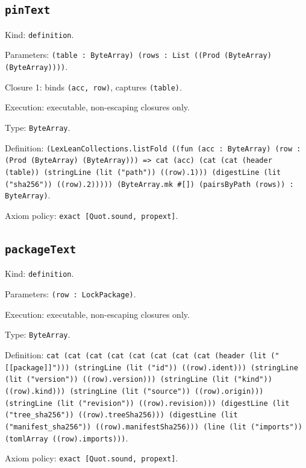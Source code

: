 \documentclass[11pt]{article}
\begin{document}
\subsection*{\texttt{pinText}}
\noindent Kind: \texttt{definition}.\par
\noindent Parameters: \texttt{(table : ByteArray) (rows : List ((Prod (ByteArray) (ByteArray))))}.\par
\noindent Closure 1: binds \texttt{(acc, row)}, captures \texttt{(table)}.\par
\noindent Execution: executable, non-escaping closures only.\par
\noindent Type: \texttt{ByteArray}.\par
\noindent Definition: \texttt{(LexLeanCollections.listFold ((fun (acc : ByteArray) (row : (Prod (ByteArray) (ByteArray))) => cat (acc) (cat (cat (header (table)) (stringLine (lit ("path")) ((row).1))) (digestLine (lit ("sha256")) ((row).2))))) (ByteArray.mk \#[]) (pairsByPath (rows)) : ByteArray)}.\par
\noindent Axiom policy: \texttt{exact [Quot.sound, propext]}.\par
\subsection*{\texttt{packageText}}
\noindent Kind: \texttt{definition}.\par
\noindent Parameters: \texttt{(row : LockPackage)}.\par
\noindent Execution: executable, non-escaping closures only.\par
\noindent Type: \texttt{ByteArray}.\par
\noindent Definition: \texttt{cat (cat (cat (cat (cat (cat (cat (cat (header (lit ("[[package]]"))) (stringLine (lit ("id")) ((row).ident))) (stringLine (lit ("version")) ((row).version))) (stringLine (lit ("kind")) ((row).kind))) (stringLine (lit ("source")) ((row).origin))) (stringLine (lit ("revision")) ((row).revision))) (digestLine (lit ("tree\_sha256")) ((row).treeSha256))) (digestLine (lit ("manifest\_sha256")) ((row).manifestSha256))) (line (lit ("imports")) (tomlArray ((row).imports)))}.\par
\noindent Axiom policy: \texttt{exact [Quot.sound, propext]}.\par
\end{document}
